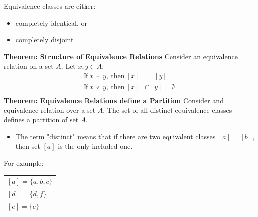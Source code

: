 Equivalence classes are either:
\begin{itemize}
  \item completely identical, or
  \item completely disjoint
\end{itemize}
\textbf{Theorem: Structure of Equivalence Relations}
Consider an equivalence relation on a set $A$. Let $x,y \in A$:
\begin{align*}
  \text{If}~x \sim y,~\text{then}~[x]      & = [y]                \\
  \text{If}~x \not \sim y,~\text{then}~[x] & \cap [y] = \emptyset \\
\end{align*}
\textbf{Theorem: Equivalence Relations define a Partition}
Consider and equivalence relation over a set $A$. The set of all distinct equivalence classes defines a partition of set $A$.
\begin{itemize}
  \item The term "distinct" means that if there are two equivalent classes $[a] = [b]$, then set $[a]$ is the only included one.
\end{itemize}
For example:
\begin{center}
  \qquad
  \qquad
  \begin{tabular}{l}
    $[a] = \{a,b,c\}$ \\
    $[d] = \{d,f\}$   \\
    $[e] = \{e\}$     \\
  \end{tabular}
\end{center}

